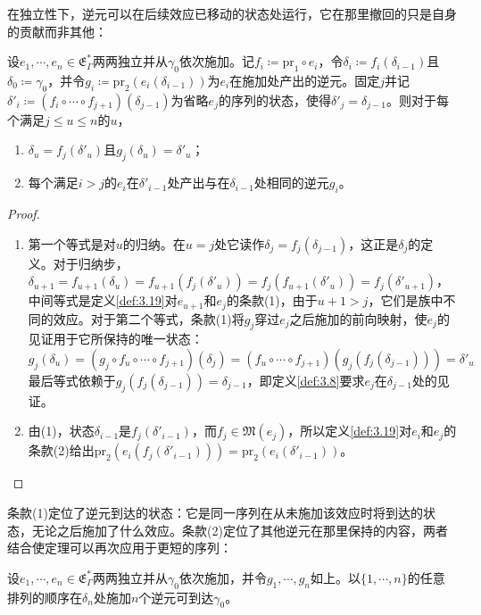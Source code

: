 在独立性下，逆元可以在后续效应已移动的状态处运行，它在那里撤回的只是自身的贡献而非其他：

\begin{theorem}\label{thm:3.20}
设$e_1, \cdots, e_n \in \mathfrak{E}^*_\Gamma$两两独立并从$\gamma_0$依次施加。记$f_i \coloneqq \mathrm{pr}_1 \circ e_i$，令$\delta_i \coloneqq f_i(\delta_{i-1})$且$\delta_0 \coloneqq \gamma_0$，并令$g_i \coloneqq \mathrm{pr}_2(e_i(\delta_{i-1}))$为$e_i$在施加处产出的逆元。固定$j$并记$\delta'_i \coloneqq (f_i \circ \cdots \circ f_{j+1})(\delta_{j-1})$为省略$e_j$的序列的状态，使得$\delta'_j = \delta_{j-1}$。则对于每个满足$j \leqslant u \leqslant n$的$u$，
\begin{enumerate}
\item $\delta_u = f_j(\delta'_u)$且$g_j(\delta_u) = \delta'_u$；
\item 每个满足$i > j$的$e_i$在$\delta'_{i-1}$处产出与在$\delta_{i-1}$处相同的逆元$g_i$。
\end{enumerate}
\end{theorem}

\begin{proof}
\begin{enumerate}
\item 第一个等式是对$u$的归纳。在$u = j$处它读作$\delta_j = f_j(\delta_{j-1})$，这正是$\delta_j$的定义。对于归纳步，$\delta_{u+1} = f_{u+1}(\delta_u) = f_{u+1}(f_j(\delta'_u)) = f_j(f_{u+1}(\delta'_u)) = f_j(\delta'_{u+1})$，中间等式是定义\ref{def:3.19}对$e_{u+1}$和$e_j$的条款(1)，由于$u+1 > j$，它们是族中不同的效应。对于第二个等式，条款(1)将$g_j$穿过$e_j$之后施加的前向映射，使$e_j$的见证用于它所保持的唯一状态：
\[
g_j(\delta_u) = (g_j \circ f_u \circ \cdots \circ f_{j+1})(\delta_j) = (f_u \circ \cdots \circ f_{j+1})(g_j(f_j(\delta_{j-1}))) = \delta'_u
\]
最后等式依赖于$g_j(f_j(\delta_{j-1})) = \delta_{j-1}$，即定义\ref{def:3.8}要求$e_j$在$\delta_{j-1}$处的见证。
\item 由(1)，状态$\delta_{i-1}$是$f_j(\delta'_{i-1})$，而$f_j \in \mathfrak{M}(e_j)$，所以定义\ref{def:3.19}对$e_i$和$e_j$的条款(2)给出$\mathrm{pr}_2(e_i(f_j(\delta'_{i-1}))) = \mathrm{pr}_2(e_i(\delta'_{i-1}))$。
\end{enumerate}
\end{proof}

条款(1)定位了逆元到达的状态：它是同一序列在从未施加该效应时将到达的状态，无论之后施加了什么效应。条款(2)定位了其他逆元在那里保持的内容，两者结合使定理可以再次应用于更短的序列：

\begin{corollary}\label{cor:3.21}
设$e_1, \cdots, e_n \in \mathfrak{E}^*_\Gamma$两两独立并从$\gamma_0$依次施加，并令$g_1, \cdots, g_n$如上。以$\{1, \cdots, n\}$的任意排列的顺序在$\delta_n$处施加$n$个逆元可到达$\gamma_0$。
\end{corollary}

